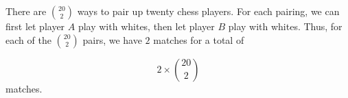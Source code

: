 There are ${20 \choose 2}$ ways to pair up twenty chess players. For each pairing, we can first let player $A$ play with whites, then let player $B$ play with whites. Thus, for each of the ${20 \choose 2}$ pairs, we have $2$ matches for a total of

  $$ 2 \times {20 \choose 2} $$
matches.